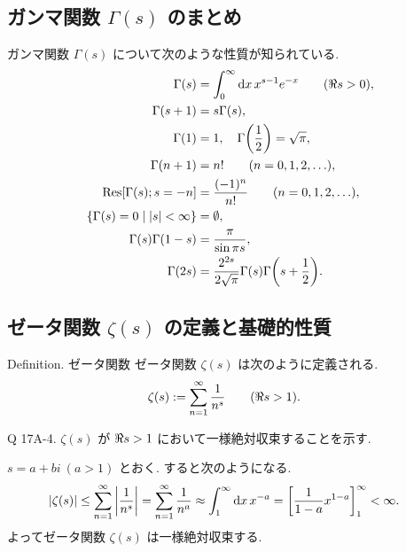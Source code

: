 \documentclass[uplatex,dvipdfmx,a4paper,11pt]{jlreq}
\theoremstyle{definition}
\begin{document}
\subsection{ガンマ関数 $\Gamma(s)$ のまとめ}
ガンマ関数 $\Gamma(s)$ について次のような性質が知られている.
\begin{align}
  \Gamma(s)                                    & = \int_0^\infty \dd{x}x^{s-1}e^{-x} \qquad (\real s > 0),         \\
  \Gamma(s + 1)                                & = s\Gamma(s),                                                     \\
  \Gamma(1)                                    & = 1, \quad \Gamma\qty(\frac{1}{2}) = \sqrt{\pi},                  \\
  \Gamma(n + 1)                                & = n! \qquad (n = 0,1,2,\ldots),                                   \\
  \Res[\Gamma(s); s = -n]                      & = \frac{(-1)^n}{n!} \qquad (n = 0,1,2,\ldots),                    \\
  \lbrace\Gamma(s) = 0\mid |s| < \infty\rbrace & = \emptyset,                                                      \\
  \Gamma(s)\Gamma(1-s)                         & = \frac{\pi}{\sin\pi s},                                          \\
  \Gamma(2s)                                   & = \frac{2^{2s}}{2\sqrt{\pi}}\Gamma(s)\Gamma\qty(s + \frac{1}{2}).
\end{align}

\subsection{ゼータ関数 $\zeta(s)$ の定義と基礎的性質}
\begin{itembox}[l]{Definition. ゼータ関数}
  ゼータ関数 $\zeta(s)$ は次のように定義される.
  \begin{align}
    \zeta(s) & := \sum_{n=1}^{\infty}\frac{1}{n^s} \qquad (\real s > 1).
  \end{align}
\end{itembox}

\begin{itembox}[l]{Q 17A-4.}
  $\zeta(s)$ が $\real s > 1$ において一様絶対収束することを示す.
\end{itembox}

$s = a + bi\ (a > 1)$ とおく. すると次のようになる.
\begin{align}
  |\zeta(s)| & \leq \sum_{n=1}^{\infty}\qty|\frac{1}{n^s}| = \sum_{n=1}^{\infty}\frac{1}{n^a} \approx \int_{1}^{\infty}\dd{x}x^{-a} = \qty[\frac{1}{1 - a}x^{1-a}]_1^\infty < \infty.
\end{align}
よってゼータ関数 $\zeta(s)$ は一様絶対収束する.
\end{document}
